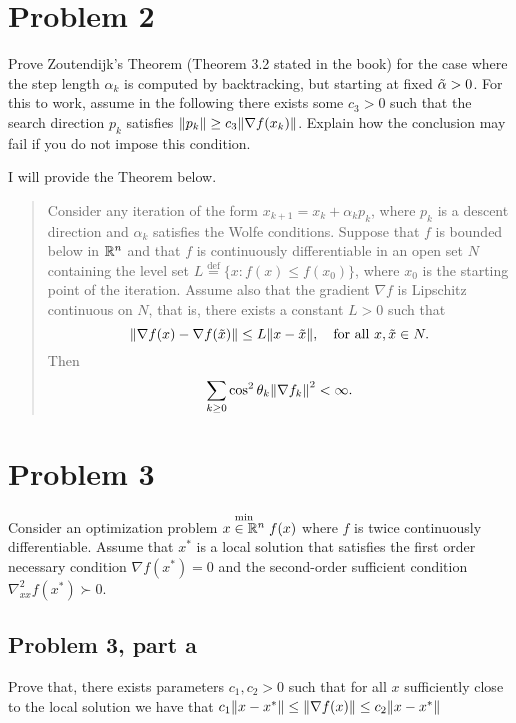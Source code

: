 \section{Problem 2}
Prove Zoutendijk's Theorem (Theorem 3.2 stated in the book) for the case where the step length $\alpha_k$ is computed by backtracking, but starting at fixed $\Tilde{\alpha} > 0$. For this to work, assume in the following there exists some $c_3 > 0$ such that the search direction $p_k$ satisfies $\norm{p_k} \geq c_3 \norm{\nabla f(x_k)}$. Explain how the conclusion may fail if you do not impose this condition.
\partbreak
\begin{solution}

    I will provide the Theorem below.
    \tightalignbreak
    \begin{quote}
        Consider any iteration of the form $x_{k+1} = x_k + \alpha_k p_k$, where $p_k$ is a descent direction and $\alpha_k$ satisfies the Wolfe conditions. Suppose that $f$ is bounded below in $\mathbb{R}^n$ and that $f$ is continuously differentiable in an open set $N$ containing the level set $L \stackrel{\text{def}}{=} \{ x : f(x) \leq f(x_0)\}$, where $x_0$ is the starting point of the iteration. Assume also that the gradient $\nabla f$ is Lipschitz continuous on $N$, that is, there exists a constant $L > 0$ such that 
        \[\norm{\nabla f(x) - \nabla f(\Tilde{x})} \leq L\norm{x - \Tilde{x}}, \quad \text{for all } x, \Tilde{x} \in N.\]
        Then
        \[\sum_{k \geq 0} \cos^2\theta_k \norm{\nabla f_k}^2 < \infty.\]
    \end{quote}
    \vspace{-6mm}\alignbreak

    
\end{solution}

\newpage
\section{Problem 3}
Consider an optimization problem $\stackrel{\text{min}}{x \in \mathbb{R}^n} f(x)$ where $f$ is twice continuously differentiable. Assume that $x^*$ is a local solution that satisfies the first order necessary condition $\nabla f(x^*) = 0$ and the second-order sufficient condition $\nabla_{xx}^2f(x^*) \succ 0$.
\subsection{Problem 3, part a}
Prove that, there exists parameters $c_1, c_2 > 0$ such that for all $x$ sufficiently close to the local solution we have that $c_1 \norm{x - x^*} \leq \norm{\nabla f(x)} \leq c_2\norm{x - x^*}$ 

